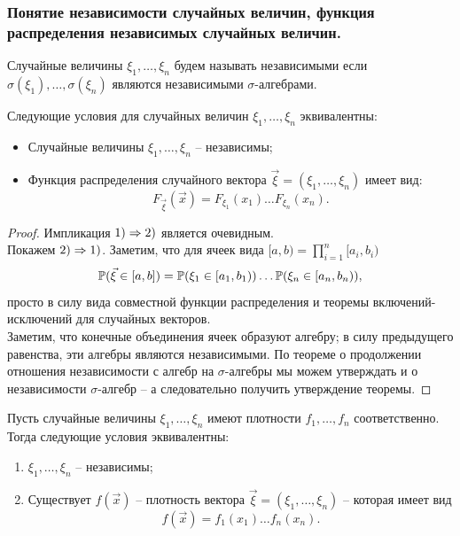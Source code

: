 \subsubsection{Понятие независимости случайных величин, функция распределения независимых случайных величин.}
\begin{definition}
    Случайные величины $\xi_1, \ldots, \xi_n$ будем называть независимыми если $\sigma(\xi_1), \ldots, \sigma(\xi_n)$ являются независимыми $\sigma$-алгебрами.
\end{definition}
\begin{theorem}
    Следующие условия для случайных величин $\xi_1, \ldots, \xi_n$ эквивалентны:
    \begin{itemize}
        \item Случайные величины $\xi_1, \ldots, \xi_n$ -- независимы;
        \item Функция распределения случайного вектора $\vec{\xi} = (\xi_1, \ldots, \xi_n)$ имеет вид:
        \[
            F_{\vec{\xi}}(\vec{x}) = F_{\xi_1}(x_1)\ldots F_{\xi_n}(x_n).
        \]
    \end{itemize}
\end{theorem}
\begin{proof}
    Импликация $1) \Ra 2)$ является очевидным. \\
    Покажем $2) \Ra 1)$. Заметим, что для ячеек вида $[a, b) = \prod_{i = 1}^n [a_i, b_i)$ 
    \[
        \P(\vec{\xi} \in [a, b]) = \P(\xi_1 \in [a_1, b_1)) \ldots \P(\xi_n \in [a_n, b_n)),
    \]
    просто в силу вида совместной функции распределения и теоремы включений-исключений для случайных векторов. \\
    Заметим, что конечные объединения ячеек образуют алгебру; в силу предыдущего равенства, эти алгебры являются независимыми. По теореме о продолжении отношения независимости с алгебр на $\sigma$-алгебры мы можем утверждать и о независимости $\sigma$-алгебр -- а следовательно получить утверждение теоремы.
\end{proof}
\begin{theorem}
    Пусть случайные величины $\xi_1, \ldots, \xi_n$ имеют плотности $f_1, \ldots, f_n$ соответственно. Тогда следующие условия эквивалентны:
    \begin{enumerate}
        \item $\xi_1, \ldots, \xi_n$ -- независимы;
        \item Существует $f(\vec{x})$ -- плотность вектора $\vec{\xi} = (\xi_1, \ldots, \xi_n)$ -- которая имеет вид 
        \[
            f(\vec{x}) = f_1(x_1)\ldots f_n(x_n).
        \]
    \end{enumerate}
\end{theorem}
